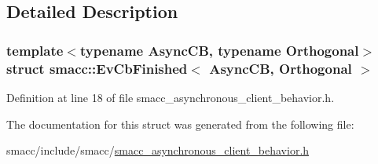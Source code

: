 \subsection{Detailed Description}
\subsubsection*{template$<$typename Async\+CB, typename Orthogonal$>$\newline
struct smacc\+::\+Ev\+Cb\+Finished$<$ Async\+C\+B, Orthogonal $>$}



Definition at line 18 of file smacc\+\_\+asynchronous\+\_\+client\+\_\+behavior.\+h.



The documentation for this struct was generated from the following file\+:\begin{DoxyCompactItemize}
\item 
smacc/include/smacc/\hyperlink{smacc__asynchronous__client__behavior_8h}{smacc\+\_\+asynchronous\+\_\+client\+\_\+behavior.\+h}\end{DoxyCompactItemize}
